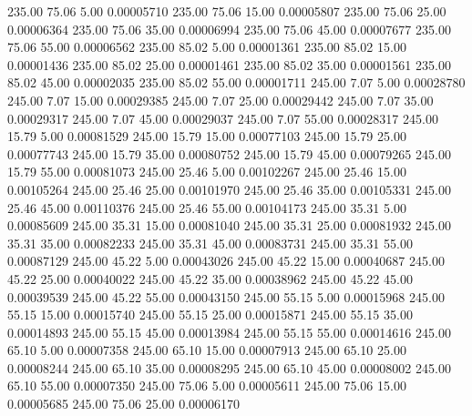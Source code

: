     235.00     75.06      5.00     0.00005710
    235.00     75.06     15.00     0.00005807
    235.00     75.06     25.00     0.00006364
    235.00     75.06     35.00     0.00006994
    235.00     75.06     45.00     0.00007677
    235.00     75.06     55.00     0.00006562
    235.00     85.02      5.00     0.00001361
    235.00     85.02     15.00     0.00001436
    235.00     85.02     25.00     0.00001461
    235.00     85.02     35.00     0.00001561
    235.00     85.02     45.00     0.00002035
    235.00     85.02     55.00     0.00001711
    245.00      7.07      5.00     0.00028780
    245.00      7.07     15.00     0.00029385
    245.00      7.07     25.00     0.00029442
    245.00      7.07     35.00     0.00029317
    245.00      7.07     45.00     0.00029037
    245.00      7.07     55.00     0.00028317
    245.00     15.79      5.00     0.00081529
    245.00     15.79     15.00     0.00077103
    245.00     15.79     25.00     0.00077743
    245.00     15.79     35.00     0.00080752
    245.00     15.79     45.00     0.00079265
    245.00     15.79     55.00     0.00081073
    245.00     25.46      5.00     0.00102267
    245.00     25.46     15.00     0.00105264
    245.00     25.46     25.00     0.00101970
    245.00     25.46     35.00     0.00105331
    245.00     25.46     45.00     0.00110376
    245.00     25.46     55.00     0.00104173
    245.00     35.31      5.00     0.00085609
    245.00     35.31     15.00     0.00081040
    245.00     35.31     25.00     0.00081932
    245.00     35.31     35.00     0.00082233
    245.00     35.31     45.00     0.00083731
    245.00     35.31     55.00     0.00087129
    245.00     45.22      5.00     0.00043026
    245.00     45.22     15.00     0.00040687
    245.00     45.22     25.00     0.00040022
    245.00     45.22     35.00     0.00038962
    245.00     45.22     45.00     0.00039539
    245.00     45.22     55.00     0.00043150
    245.00     55.15      5.00     0.00015968
    245.00     55.15     15.00     0.00015740
    245.00     55.15     25.00     0.00015871
    245.00     55.15     35.00     0.00014893
    245.00     55.15     45.00     0.00013984
    245.00     55.15     55.00     0.00014616
    245.00     65.10      5.00     0.00007358
    245.00     65.10     15.00     0.00007913
    245.00     65.10     25.00     0.00008244
    245.00     65.10     35.00     0.00008295
    245.00     65.10     45.00     0.00008002
    245.00     65.10     55.00     0.00007350
    245.00     75.06      5.00     0.00005611
    245.00     75.06     15.00     0.00005685
    245.00     75.06     25.00     0.00006170
